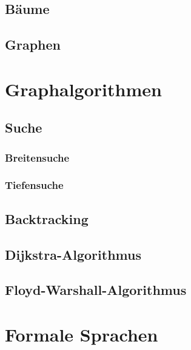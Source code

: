 \documentclass[german]{../spicker}
\begin{document}
\subsection{Bäume}






\subsection{Graphen}

\section{Graphalgorithmen}
\subsection{Suche}
\subsubsection{Breitensuche}

\subsubsection{Tiefensuche}

\subsection{Backtracking}

\subsection{Dijkstra-Algorithmus}

\subsection{Floyd-Warshall-Algorithmus}

\section{Formale Sprachen}


\end{document}
